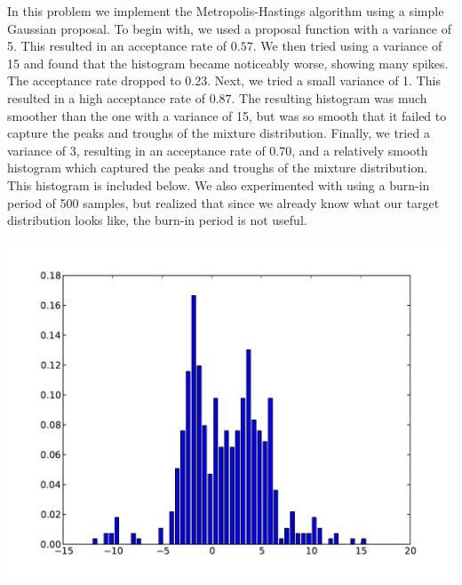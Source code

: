\documentclass[solution, letterpaper]{cs121}
\begin{document}
\begin{empfile}
\pagebreak

\subproblem %
In this problem we implement the Metropolis-Hastings algorithm using a simple Gaussian proposal. To begin with, we used a proposal function with a variance of 5. This resulted in an acceptance rate of $0.57$. We then tried using a variance of 15 and found that the histogram became noticeably worse, showing many spikes. The acceptance rate dropped to $0.23$. Next, we tried a small variance of 1. This resulted in a high acceptance rate of $0.87$. The resulting histogram was much smoother than the one with a variance of 15, but was so smooth that it failed to capture the peaks and troughs of the mixture distribution. Finally, we tried a variance of 3, resulting in an acceptance rate of $0.70$, and a relatively smooth histogram which captured the peaks and troughs of the mixture distribution. This histogram is included below. We also experimented with using a burn-in period of 500 samples, but realized that since we already know what our target distribution looks like, the burn-in period is not useful. 

\begin{center}
\includegraphics[scale=0.8]{hasty_metro_histogram.pdf}
\end{center}


\end{empfile}

\immediate{}
\end{document}
